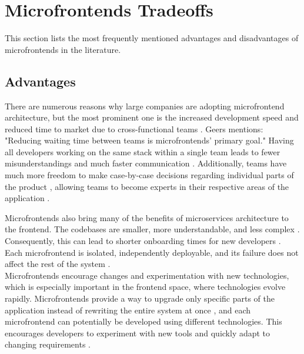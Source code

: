 \section{Microfrontends Tradeoffs}
This section lists the most frequently mentioned advantages and disadvantages of microfrontends in the literature.

\subsection{Advantages}
There are numerous reasons why large companies are adopting microfrontend architecture, but the most prominent one is the increased development speed and reduced time to market due to cross-functional teams \cite{Geers}\cite{Montelius}\cite{Peltonen}. Geers \cite{Geers} mentions: "Reducing waiting time between teams is microfrontends' primary goal." Having all developers working on the same stack within a single team leads to fewer misunderstandings and much faster communication \cite{Geers}\cite{Montelius}. Additionally, teams have much more freedom to make case-by-case decisions regarding individual parts of the product \cite{Jackson}\cite{Geers}, allowing teams to become experts in their respective areas of the application \cite{Montelius}.

\noindent
Microfrontends also bring many of the benefits of microservices architecture to the frontend. The codebases are smaller, more understandable, and less complex \cite{Geers}\cite{Jackson}\cite{Montelius}. Consequently, this can lead to shorter onboarding times for new developers \cite{Peltonen}. Each microfrontend is isolated, independently deployable, and its failure does not affect the rest of the system \cite{Peltonen}\cite{Montelius}\cite{Jackson}\cite{Geers}.\\

\noindent
Microfrontends encourage changes and experimentation with new technologies, which is especially important in the frontend space, where technologies evolve rapidly. Microfrontends provide a way to upgrade only specific parts of the application instead of rewriting the entire system at once \cite{Jackson}\cite{Montelius}, and each microfrontend can potentially be developed using different technologies. This encourages developers to experiment with new tools and quickly adapt to changing requirements \cite{Peltonen}.

